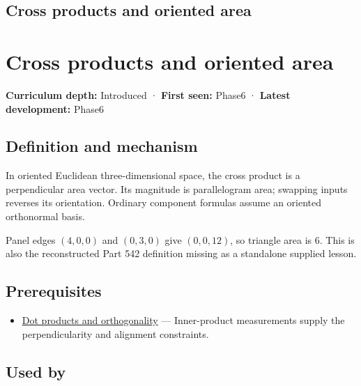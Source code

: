\hypertarget{appendix-2391db8052b1}{}
\section*{Cross products and oriented area}
\chapter{Cross products and oriented area}\label{appendix-2391db8052b1-cross-products-and-oriented-area}

\textbf{Curriculum depth:} Introduced · \textbf{First seen:} Phase6 · \textbf{Latest development:} Phase6

\section{Definition and mechanism}\label{appendix-2391db8052b1-definition-and-mechanism}

In oriented Euclidean three-dimensional space, the cross product is a perpendicular area vector. Its magnitude is parallelogram area; swapping inputs reverses its orientation. Ordinary component formulas assume an oriented orthonormal basis.

Panel edges \((4,0,0)\) and \((0,3,0)\) give \((0,0,12)\), so triangle area is \(6\). This is also the reconstructed Part 542 definition missing as a standalone supplied lesson.

\section{Prerequisites}\label{appendix-2391db8052b1-prerequisites}

\begin{itemize}
\tightlist
\item
  \hyperref[appendix-8bc4e8fc547c]{Dot products and orthogonality} --- Inner-product measurements supply the perpendicularity and alignment constraints.
\end{itemize}

\section{Used by}\label{appendix-2391db8052b1-used-by}


